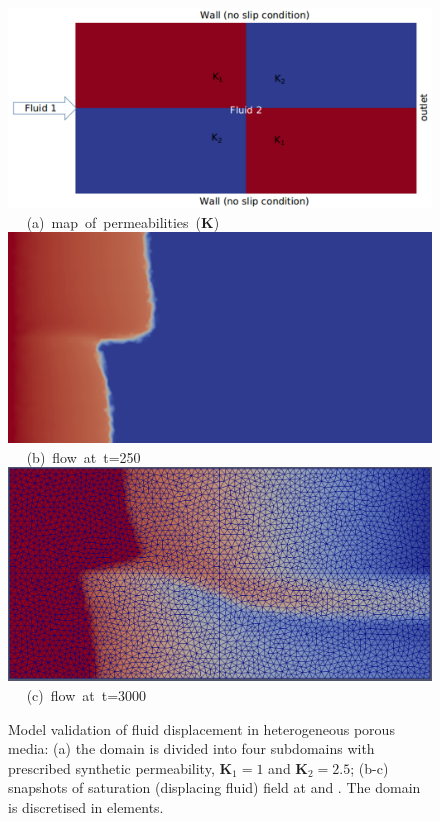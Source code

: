 \begin{figure}[ht] 
\vbox{
\hbox{\hspace{-0.3cm}
\includegraphics[width=.8\textwidth]{./Pics1/2b2_wi_fine/2b2_whole_in_fine_perm_1.pdf} 
}
\vspace{0.0cm}
\hbox{\hspace{5.0cm} (a) map of permeabilities ($\mathbf{K}$)
}
\vspace{0.25cm}
\hbox{\hspace{1.5cm}
\includegraphics[width=.65\textwidth]{./Pics1/2b2_wi_fine/2b2_whole_in_fine_250_2.pdf}
}
\vspace{0.0cm}
\hbox{\hspace{5.0cm} (b) flow at t=250  
}
\vspace{0.25cm}
\hbox{\hspace{1.5cm}
\includegraphics[width=.65\textwidth]{./Pics1/2b2_wi_fine/2b2_whole_in_fine_3000_1.pdf}
}
\vspace{0.0cm}
\hbox{\hspace{5.0cm} (c) flow at t=3000  
}
}     
\caption{Model validation of fluid displacement in heterogeneous porous media: (a) the domain is divided into four subdomains with prescribed synthetic permeability, $\mathbf{K}_{1}=1$ and $\mathbf{K}_{2}=2.5$; (b-c) snapshots of saturation (displacing fluid) field at  and . The domain is discretised in   elements. }
\label{fem_cv_represent_a}
\end{figure}
\clearpage



